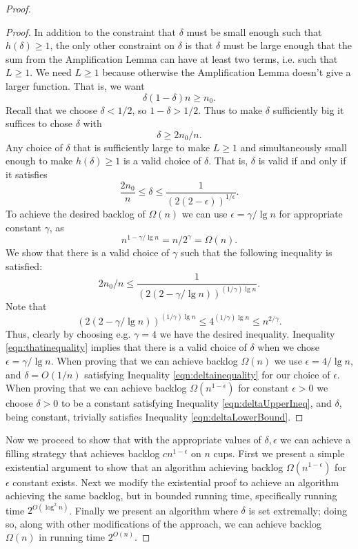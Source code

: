 \documentclass[twocolumn]{article}[10pt]
\begin{document}
\begin{proof}
\begin{proof}
  In addition to the constraint that $\delta$ must be small enough such that
  $h(\delta) \ge 1$, the only other constraint on $\delta$ is that $\delta$
  must be large enough that the sum from the Amplification Lemma can have at least
  two terms, i.e. such that $L \ge 1$. We need $L\ge 1$ because otherwise the
  Amplification Lemma doesn't give a larger function.
  That is, we want
  $$\delta(1-\delta)n \ge n_0. $$
  Recall that we choose $\delta < 1/2$, so $1-\delta > 1/2$. Thus to make
  $\delta$ sufficiently big it suffices to chose $\delta$ with 
  \begin{equation}
    \label{eqn:deltaLowerBound}
    \delta \ge 2n_0/n.
  \end{equation}
  Any choice of $\delta$ that is sufficiently large to make $L \ge 1$ and
  simultaneously small enough to make $h(\delta) \ge 1$ is a valid choice of
  $\delta$. That is, $\delta$ is valid if and only if it satisfies
  \begin{equation}
    \label{eqn:deltainequality}
    \frac{2n_0}{n} \le \delta \le  \frac{1}{(2(2-\epsilon))^{1/\epsilon}}.
  \end{equation}
  To achieve the desired backlog of $\Omega(n)$ we can use $\epsilon =
  \gamma/\lg n$ for appropriate constant $\gamma$, as $$n^{1-\gamma/\lg n} =
  n/2^\gamma = \Omega(n).$$
  We show that there is a valid choice of $\gamma$ such that the following inequality is satisfied:
  \begin{equation}
    \label{eqn:thatinequality}
   2n_0/n \le \frac{1}{(2(2-\gamma/\lg n))^{(1/\gamma)\lg n}}.
  \end{equation}
  Note that 
  $$(2(2-\gamma/\lg n))^{(1/\gamma)\lg n} \le 4^{(1/\gamma)\lg n} \le n^{2/\gamma}.$$
  Thus, clearly by choosing e.g. $\gamma = 4$ we have the desired inequality.
  Inequality \ref{eqn:thatinequality} implies that there is a valid choice of
  $\delta$ when we chose $\epsilon = \gamma / \lg n$. When proving that we can
  achieve backlog $\Omega(n)$ we use $\epsilon = 4 / \lg n$, and $\delta =
  O(1/n)$ satisfying Inequality \ref{eqn:deltainequality} for our choice
  of $\epsilon$. When proving that we can achieve backlog
  $\Omega(n^{1-\epsilon})$ for constant $\epsilon > 0$ we choose $\delta > 0$ to be
  a constant satisfying Inequality \ref{eqn:deltaUpperIneq}, and $\delta$,
  being constant, trivially satisfies Inequality \ref{eqn:deltaLowerBound}.
    
  \end{proof}

  Now we proceed to show that with the appropriate values of $\delta, \epsilon$ we
  can achieve a filling strategy that achieves backlog $cn^{1-\epsilon}$ on $n$ cups.
  First we present a simple existential argument to show that an algorithm
  achieving backlog $\Omega(n^{1-\epsilon})$ for $\epsilon$ constant exists. Next we modify the
  existential proof to achieve an algorithm achieving the same backlog, but in
  bounded running time, specifically running time $2^{O(\log^2 n)}$.
  Finally we present an algorithm where $\delta$ is set extremally; doing so,
  along with other modifications of the approach, we can achieve backlog
  $\Omega(n)$ in running time $2^{O(n)}$.
  

\end{proof}
\end{document}
